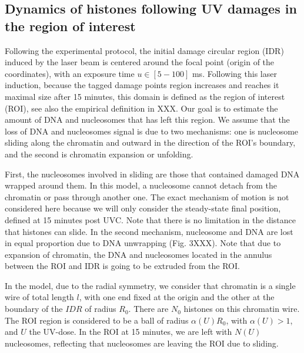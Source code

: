 \documentclass[12pt]{article}
\begin{document}
\subsection{Dynamics of histones following UV damages in the region of interest}
Following the experimental protocol, the initial damage circular region (IDR) induced by the laser beam is centered around the focal point (origin of the coordinates), with an exposure time $u \in [5-100]$ ms. Following this laser induction, because the tagged damage points region increases and reaches it maximal size after 15 minutes, this domain is defined as the region of interest (ROI), see also the empirical definition in XXX. Our goal is to estimate the amount of DNA and nucleosomes that has left this region. We assume that the loss of DNA and nucleosomes signal is due to two mechanisms: one is nucleosome sliding along the chromatin and outward in the direction of the ROI's boundary, and the second is chromatin expansion or unfolding. 

First, the nucleosomes involved in sliding are those that contained damaged DNA wrapped around them. In this model, a nucleosome cannot detach from the chromatin or pass through another one. The exact mechanism of motion is not considered here because we will only consider the steady-state final position, defined at 15 minutes post UVC. Note that there is no limitation in the distance that histones can slide.  In the second mechanism, nucleosome and DNA are lost in equal proportion due to DNA unwrapping (Fig. 3XXX). Note that due to expansion of chromatin, the DNA and nucleosomes located in the annulus between the ROI and IDR is going to be extruded from the ROI.

In the model, due to the radial symmetry, we consider that chromatin is a single wire of total length $l$, with one end fixed at the origin and the other at the boundary of the $IDR$ of radius $R_0$. There are $N_0$ histones on this chromatin wire.  The ROI region is considered to be a ball of radius $\alpha(U) R_0$, with  $\alpha(U)>1$, and $U$ the UV-dose. In the ROI at 15 minutes, we are left with $N(U)$ nucleosomes, reflecting that nucleosomes are leaving the ROI due to sliding.
\end{document}
